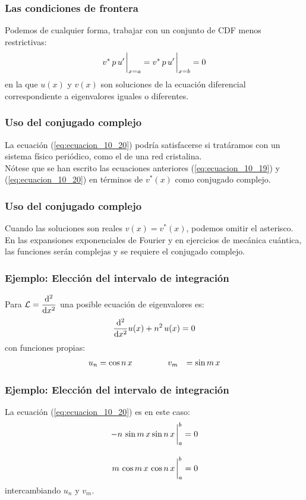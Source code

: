 \documentclass[12pt]{beamer}
\begin{document}
\begin{frame}
\frametitle{Las condiciones de frontera}
Podemos de cualquier forma, trabajar con un conjunto de CDF menos restrictivas:
\pause
\begin{equation}
v^{*} \, p \, \pderivada{u} \eval_{x = a} = v^{*} \, p \, \pderivada{u} \eval_{x = b} = 0
\label{eq:ecuacion_10_20}
\end{equation}
en la que $u(x)$ y $v(x)$ son soluciones de la ecuación diferencial correspondiente a eigenvalores iguales o diferentes.
\end{frame}
\begin{frame}
\frametitle{Uso del conjugado complejo}
La ecuación (\ref{eq:ecuacion_10_20}) podría satisfacerse si tratáramos con un sistema físico periódico, como el de una red cristalina.
\\
\bigskip
\pause
Nótese que se han escrito las ecuaciones anteriores  (\ref{eq:ecuacion_10_19}) y (\ref{eq:ecuacion_10_20}) en términos de $v^{*} (x)$ como conjugado complejo.
\end{frame}
\begin{frame}
\frametitle{Uso del conjugado complejo}
Cuando las soluciones son reales $v(x) = v^{*} (x)$, podemos omitir el asterisco.
\\
\bigskip
\pause
En las expansiones exponenciales de Fourier y en ejercicios de mecánica cuántica, las funciones serán complejas y se requiere el conjugado complejo.
\end{frame}
\begin{frame}
\frametitle{Ejemplo: Elección del intervalo de integración}
Para $\displaystyle \mathcal{L} = \dv[2]{x}$ una posible ecuación de eigenvalores es:
\pause
\begin{align}
\dv[2]{x} u(x) + n^{2} \, u(x) = 0
\label{eq:ecuacion_10_21}
\end{align}
\pause
con funciones propias:
\begin{align*}
u_{n} &= \cos n \, x \hspace{1.5cm} v_{m} &= \sin m \, x
\end{align*}
\end{frame}
\begin{frame}
\frametitle{Ejemplo: Elección del intervalo de integración}
La ecuación (\ref{eq:ecuacion_10_20}) es en este caso:
\pause
\begin{align*}
- n \, \sin m \, x \sin n \, x \eval^{b}_{a} &= 0 \\[1em]
m \, \cos m \, x \, \cos n \, x \eval^{b}_{a} &= 0 
\end{align*}
intercambiando $u_{n}$ y $v_{m}$.
\end{frame}
\end{document}
